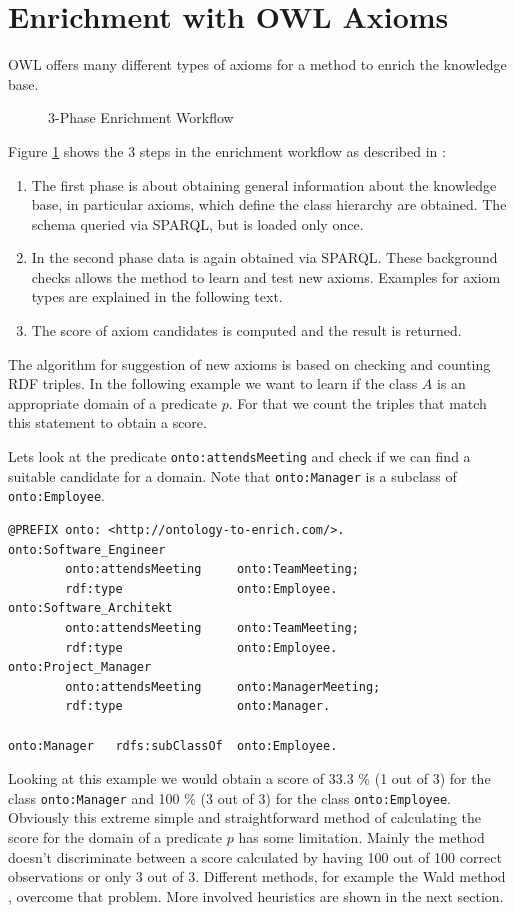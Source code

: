 \section{Enrichment with OWL Axioms}
OWL offers many different types of axioms for a method to enrich the knowledge
base. 
\begin{figure}
\label{3-Phase}
\centering
{}
\caption{3-Phase Enrichment Workflow\cite{paper2}}
\end{figure}
Figure \ref{3-Phase} shows the 3 steps in the enrichment workflow as described
in \cite{paper2}:
\begin{enumerate}
  \item The first phase is about obtaining general information about the
  knowledge base, in particular axioms, which define the class hierarchy are
  obtained. The schema queried via SPARQL, but is loaded only once.
  \item In the second phase data is again obtained via SPARQL. These background
  checks allows the method to learn and test new axioms. Examples for axiom
  types are explained in the following text.
  \item The score of axiom candidates is computed and the result is returned.
\end{enumerate}

The algorithm for suggestion of new axioms is based on checking and counting RDF
triples. In the following example we want to learn if the class $A$ is an
appropriate domain of a predicate $p$. For that we count the triples that match
this statement to obtain a score. 

\begin{example}
Lets look at the predicate \texttt{onto:attendsMeeting} and check if we can find
a suitable candidate for a domain. Note that \texttt{onto:Manager} is a subclass
of \texttt{onto:Employee}.
\end{example}
\begin{lstlisting}[morekeywords={onto, rdf, rdfs}, caption=Triples written in
turtle syntax] @PREFIX onto: <http://ontology-to-enrich.com/>.
onto:Software_Engineer		
		onto:attendsMeeting 	onto:TeamMeeting;
		rdf:type				onto:Employee.
onto:Software_Architekt		
		onto:attendsMeeting 	onto:TeamMeeting;
		rdf:type				onto:Employee.
onto:Project_Manager		
		onto:attendsMeeting 	onto:ManagerMeeting;
		rdf:type				onto:Manager.
		
onto:Manager   rdfs:subClassOf	onto:Employee.
\end{lstlisting}
Looking at this example we would obtain a score of 33.3 \% (1 out of 3) for the
class \texttt{onto:Manager} and 100 \% (3 out of 3) for the class
\texttt{onto:Employee}.\\
Obviously this extreme simple and straightforward method of calculating the score
for the domain of a predicate $p$ has some limitation.
Mainly the method doesn't discriminate between a score calculated by having 100
out of 100 correct observations or only 3 out of 3. Different methods, for
example the Wald method \cite{wald-methods}, overcome that problem. 
More involved heuristics are shown in the next section. 

